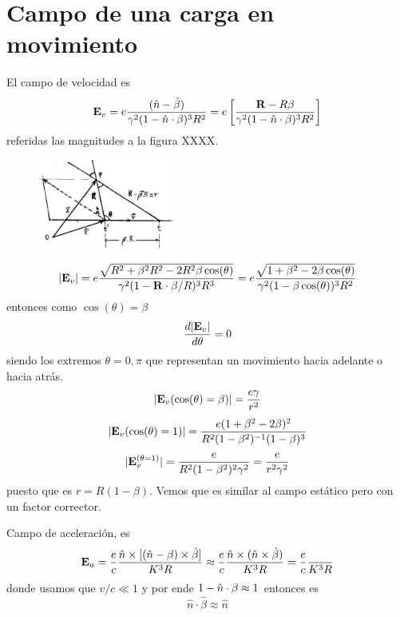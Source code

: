 \documentclass[10pt,oneside]{CBFT_book}
\begin{document}
\section{Campo de una carga en movimiento}

El campo de velocidad es 
\[
	\vb{E}_v = e \frac{(\hat{n}-\hat{\beta})}{\gamma^2(1-\hat{n}\cdot\vb{\beta})^3R^2} =
		e \left[ \frac{\vb{R}-R\vb{\beta}}{\gamma^2(1-\hat{n}\cdot\vb{\beta})^3R^2} \right]
\]
referidas las magnitudes a la figura XXXX.

\begin{figure}[htb]
	\begin{center}
	\includegraphics[width=0.4\textwidth]{images/fig_ft1_campo_carga_mov2.pdf}	 
	\end{center}
	\caption{}
\end{figure} 

\[
	|\vb{E}_v| = e\frac{\sqrt{ R^2 + \beta^2 R^2 - 2R^2 \beta \cos(\theta)}}
		{\gamma^2( 1 - \vb{R}\cdot\vb{\beta}/R)^3 R^3} =
		e\frac{\sqrt{ 1 + \beta^2 - 2 \beta \cos(\theta)}}
		{\gamma^2( 1 - \beta \cos(\theta))^3 R^2}
\]
entonces como $\cos(\theta) = \beta$
\[
	\dtot{ |\vb{E}_v| }{\theta}= 0
\]
siendo los extremos $\theta=0,\pi$ que representan un movimiento hacia adelante o hacia atrás.
\[
	|\vb{E}_v(\cos(\theta) = \beta)| = \frac{e\gamma}{r^2}
\]
\[
	|\vb{E}_v(\cos(\theta) = 1)| = \frac{e (1+\beta^2-2\beta)^2}{R^2(1-\beta^2)^{-1}(1-\beta)^3}
\]
\[
	|\vb{E}_v^{(\theta = 1)}| = \frac{e }{R^2(1-\beta^2)^2 \gamma^2} = \frac{e}{r^2 \gamma^2}
\]
puesto que es $r=R(1-\beta)$. Vemos que es similar al campo estático pero con un factor corrector.

Campo de aceleración, es
\[
	\vb{E}_a = \frac{e}{c} \frac{ \hat{n} \times [ (\hat{n}-\vb{\beta})\times \dot{\vb{\beta}} ]}{K^3 R} 
		\approx \frac{e}{c} \frac{ \hat{n} \times ( \hat{n} \times \dot{\vb{\beta}})}{K^3 R} 
		= \frac{e}{c} \frac{}{K^3 R}
\]
donde usamos que $v/c \ll 1$ y por ende $ 1 - \hat{n}\cdot\vb{\beta}\approx 1$ entonces es 
\[
	\hat{n} \cdot \hat{\beta} \approx \hat{n}
\]
\end{document}
